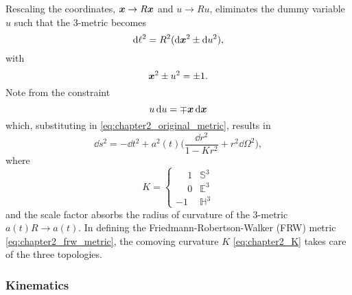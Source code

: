 \noindent
Rescaling the coordinates, \(\vb*{x} \rightarrow R\vb*{x}\) and \(u \rightarrow Ru\), eliminates the dummy variable \(u\) such that the 3-metric becomes
%
\begin{equation}
	\dd{\ell^{2}}
	= R^{2} (\dd{\vb*{x}^{2}} \pm \dd{u^{2}}),
\end{equation}
%
with
%
\begin{equation}
	\vb*{x}^{2} \pm u^{2}
	= \pm 1.
\end{equation}
%
Note from the constraint
%
\begin{equation}
	u\dd{u}
	= \mp \vb*{x}\dd{\vb*{x}}
\end{equation}
%
which, substituting in \cref{eq:chapter2_original_metric}, results in
%
\begin{equation}\label{eq:chapter2_frw_metric}
	\dd{s^{2}}
	= -\dd{t^{2}} + a^{2}(t) \bigg( \frac{\dd{r^{2}}}{1-Kr^{2}} + r^{2}\dd{\Omega^{2}} \bigg),
\end{equation}
%
where
%
\begin{equation}\label{eq:chapter2_K}
	K =
	\begin{cases}
		\mathbin{\phantom{-}}1 & \mathbb{S}^{3} \\
		\mathbin{\phantom{-}}0 & \mathbb{E}^{3} \\
		-1                     & \mathbb{H}^{3}
	\end{cases}
\end{equation}
%
and the scale factor absorbs the radius of curvature of the 3-metric \(a(t)R \rightarrow a(t)\).
In defining the Friedmann-Robertson-Walker (FRW) metric \cref{eq:chapter2_frw_metric}, the comoving curvature \(K\) \cref{eq:chapter2_K} takes care of the three topologies.

\subsubsection{Kinematics}

